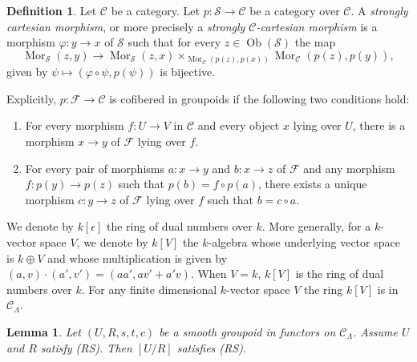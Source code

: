 \documentclass{amsart}
\theoremstyle{plain}
\newtheorem{lemma}[subsection]{Lemma}
\theoremstyle{definition}
\newtheorem{definition}[subsection]{Definition}
\theoremstyle{remark}
\numberwithin{equation}{subsection}
\def\Mor{\mathop{\mathrm{Mor}}\nolimits}
\def\Ob{\mathop{\mathrm{Ob}}\nolimits}
\begin{document}
\begin{definition}
\label{categories-definition-cartesian-over-C}
Let $\mathcal{C}$ be a category.
Let $p : \mathcal{S} \to \mathcal{C}$ be a category over $\mathcal{C}$.
A {\it strongly cartesian morphism}, or more precisely a
{\it strongly $\mathcal{C}$-cartesian morphism} is a
morphism $\varphi : y \to x$ of $\mathcal{S}$ such that
for every $z \in \Ob(\mathcal{S})$ the map
$$
\Mor_\mathcal{S}(z, y)
\longrightarrow
\Mor_\mathcal{S}(z, x)
\times_{\Mor_\mathcal{C}(p(z), p(x))}
\Mor_\mathcal{C}(p(z), p(y)),
$$
given by $\psi \longmapsto (\varphi \circ \psi, p(\psi))$
is bijective.
\end{definition}

\noindent
Explicitly, $p: \mathcal{F} \to \mathcal{C}$ is cofibered in groupoids if
the following two conditions hold:
\begin{enumerate}
\item For every morphism $f: U \to V$ in $\mathcal{C}$ and every object
$x$ lying over $U$, there is a morphism $x \to y$ of $\mathcal{F}$ lying
over $f$.
\item For every pair of morphisms $a: x \to y$ and $b: x \to z$
of $\mathcal{F}$ and any morphism $f: p(y) \to p(z)$ such that $p(b) = f
\circ p(a)$, there exists a unique morphism $c: y \to z$ of $\mathcal
F$ lying over $f$ such that $b = c \circ a$.
\end{enumerate}


\medskip\noindent
We denote by $k[\epsilon]$ the ring of dual numbers over $k$.  More
generally, for a $k$-vector space $V$, we denote by $k[V]$ the $k$-algebra
whose underlying vector space is $k \oplus V$ and whose multiplication is given
by $(a, v) \cdot (a', v') = (aa', av' + a'v)$.  When $V = k$, $k[V]$ is the ring
of dual numbers over $k$.  For any finite dimensional $k$-vector space $V$
the ring $k[V]$ is in $\mathcal{C}_\Lambda$.


\begin{lemma}
\label{lemma-smooth-RS-groupoid-in-functors-quotient}
Let $(U, R, s, t, c)$ be a smooth groupoid in functors on $\mathcal{C}_\Lambda$.
Assume $U$ and $R$ satisfy (RS). Then $[U/R]$ satisfies (RS).
\end{lemma}
\end{document}
